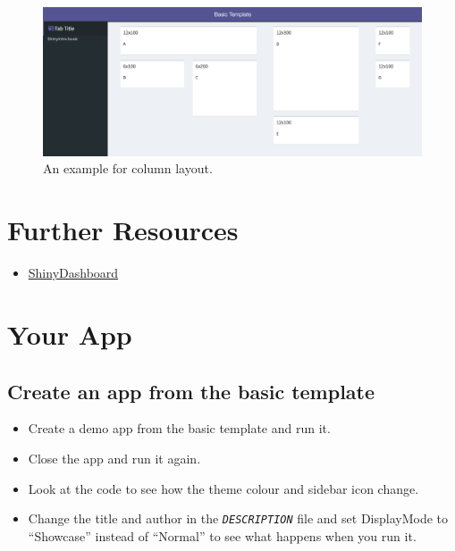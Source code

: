 \documentclass[
  oneside]{book}
\providecommand{\tightlist}{%
  \setlength{\itemsep}{0pt}\setlength{\parskip}{0pt}}
\begin{document}
\begin{figure}

{\centering \includegraphics[width=1\linewidth]{images/sdb_column_layout} 

}

\caption{An example for column layout.}\label{fig:sdb-column-layout}
\end{figure}

\hypertarget{resources-shinydashboard}{%
\section{Further Resources}\label{resources-shinydashboard}}

\begin{itemize}
\tightlist
\item
  \href{https://rstudio.github.io/shinydashboard/}{ShinyDashboard}
\end{itemize}

\hypertarget{your-app-sdb}{%
\section{Your App}\label{your-app-sdb}}

\hypertarget{create-an-app-from-the-basic-template}{%
\subsection{Create an app from the basic template}\label{create-an-app-from-the-basic-template}}

\begin{itemize}
\tightlist
\item
  Create a demo app from the basic template and run it.
\item
  Close the app and run it again.
\item
  Look at the code to see how the theme colour and sidebar icon change.
\item
  Change the title and author in the \textit{\texttt{DESCRIPTION}} file and set DisplayMode to ``Showcase'' instead of ``Normal'' to see what happens when you run it.
\end{itemize}
\end{document}
